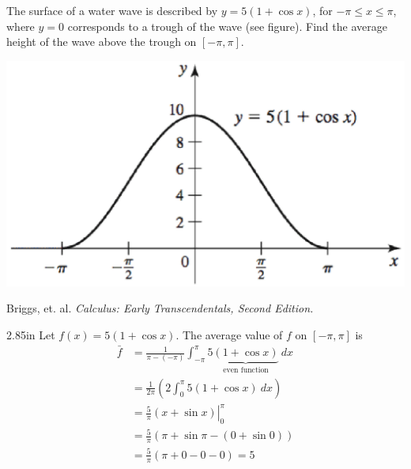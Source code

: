 \documentclass[12pt, addpoints]{exam}
\newcommand{\vstr}{\vspace{\stretch{1}}}
\theoremstyle{plain}
\begin{document}
\begin{questions}
\question[10] The surface of a water wave is described by $y=5(1+\cos x)$, for $-\pi\leq x\leq \pi$, where $y=0$ corresponds to a trough of the wave (see figure).  Find the average height of the wave above the trough on $[-\pi,\pi]$.
\vspace{-0.5pc}
\begin{center}
\includegraphics[scale=0.4]{exam4Sec5p4}

{\footnotesize Briggs, et. al. \emph{Calculus: Early Transcendentals, Second Edition.}}
\end{center}
\begin{solutionbox}
{2.85in}
Let $f(x)=5(1+\cos x)$.  The average value of $f$ on $[-\pi,\pi]$ is
\vspace{-0.5pc}
\begin{align*}
\bar f &= \frac{1}{\pi-(-\pi)}\int_{-\pi}^{\pi}5\underbrace{(1+\cos x)}_{\text{even function}}\ dx \\[0.1pc]
	&= \frac{1}{2\pi}\left(2\int_0^{\pi}5(1+\cos x)\ dx\right) \\[0.2pc]
	&= \left.\frac{5}{\pi}\left(x+\sin x\right)\right|_0^{\pi} \\[0.1pc]
	&= \frac{5}{\pi}\left(\pi+\sin{\pi}-(0+\sin 0)\right) \\[0.3pc]
	&= \frac{5}{\pi}(\pi+0-0-0)=\boxed{5}
\end{align*}
\end{solutionbox}
\vstr




\end{questions}
\end{document}
